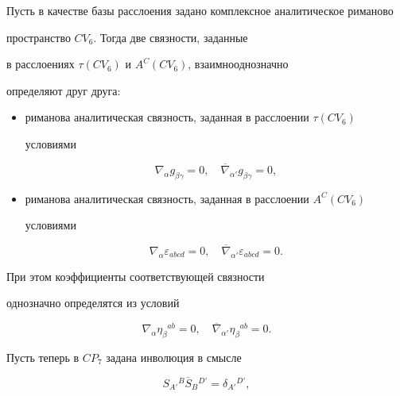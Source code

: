 \begin{thm}


Пусть в качестве базы расслоения задано комплексное аналитическое риманово


пространство $CV_6$. Тогда две связности, заданные


в расслоениях $\tau(CV_6)$ и $A^C(CV_6)$, взаимнооднозначно


определяют друг друга$:$


\begin{itemize}


\item[1.] риманова аналитическая связность, заданная в расслоении $\tau(CV_6)$


условиями


$$




\nabla_\alpha g_{\beta\gamma}=0,\quad


\overline\nabla_{\alpha '} g_{\beta\gamma}=0,


$$


\item[2.] риманова аналитическая связность, заданная в расслоении $A^C(CV_6)$


условиями


$$




\nabla_\alpha\varepsilon_{abcd}=0,\quad


\overline\nabla_{\alpha '}\varepsilon_{abcd}=0.


$$


\end{itemize}


При этом коэффициенты соответствующей связности


однозначно определятся из условий


$$




\nabla_\alpha \eta_\beta{}^{ab}=0,\quad


\overline\nabla_{\alpha '} \eta_\beta{}^{ab}=0.


$$


\end{thm}





Пусть теперь в $CP_7$ задана инволюция в смысле


\cite{7}


\begin{equation}


\label{e25a}


S_{A'}{}^B\overline S_B{}^{D'}=\delta_{A'}{}^{D'},


\end{equation}



